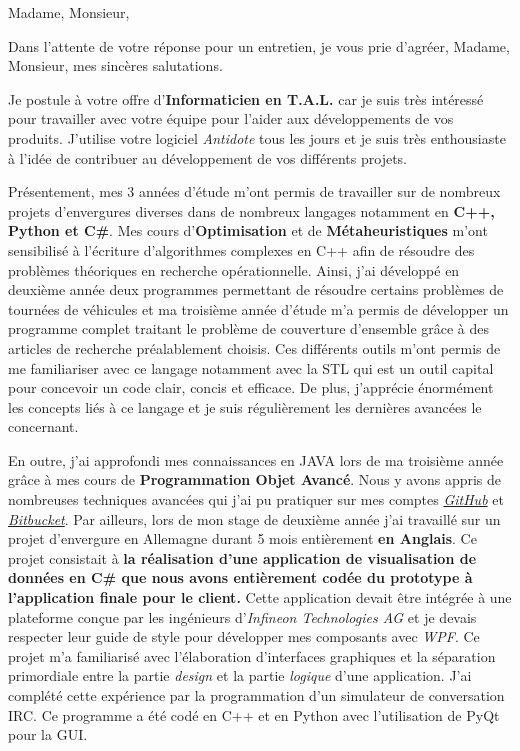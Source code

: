 \date{\today}
\opening{Madame, Monsieur,}
\closing{Dans l'attente de votre réponse pour un entretien, je vous prie d'agréer, Madame, Monsieur, mes sincères salutations.}

\makelettertitle

\introduction{}
Je postule à votre offre d'\textbf{Informaticien en T.A.L.} car je suis très intéressé pour travailler avec votre équipe pour l'aider aux développements de vos produits. J'utilise votre logiciel \textit{Antidote} tous les jours et je suis très enthousiaste à l'idée de contribuer au développement de vos différents projets.

Présentement, mes 3 années d'étude m'ont permis de travailler sur de nombreux projets d'envergures diverses dans de nombreux langages notamment en \textbf{C++, Python et C\#}. Mes cours d'\textbf{Optimisation} et de \textbf{Métaheuristiques} m'ont sensibilisé à l'écriture d'algorithmes complexes en C++ afin de résoudre des problèmes théoriques en recherche opérationnelle. Ainsi, j'ai développé en deuxième année deux programmes permettant de résoudre certains problèmes de tournées de véhicules et ma troisième année d'étude m'a permis de développer un programme complet traitant le problème de couverture d'ensemble grâce à des articles de recherche préalablement choisis. Ces différents outils m'ont permis de me familiariser avec ce langage notamment avec la STL qui est un outil capital pour concevoir un code clair, concis et efficace. De plus, j'apprécie énormément les concepts liés à ce langage et je suis régulièrement les dernières avancées le concernant.

En outre, j'ai approfondi mes connaissances en JAVA lors de ma troisième année grâce à mes cours de \textbf{Programmation Objet Avancé}. Nous y avons appris de nombreuses techniques avancées qui j'ai pu pratiquer sur mes comptes \href{https://github.com/vlnk/ShootYourFridge}{\textit{GitHub}} et \href{https://bitbucket.org/vlnk/tronpoa}{\textit{Bitbucket}}. Par ailleurs, lors de mon stage de deuxième année j'ai travaillé sur un projet d'envergure en Allemagne durant 5 mois entièrement \textbf{en Anglais}. Ce projet consistait à \textbf{la réalisation d'une application de visualisation de données en C\# que nous avons entièrement codée du prototype à l'application finale pour le client.} Cette application devait être intégrée à une plateforme conçue par les ingénieurs d'\textit{Infineon Technologies AG} et je devais respecter leur guide de style pour développer mes composants avec \textit{WPF}. Ce projet m'a familiarisé avec l'élaboration d'interfaces graphiques et la séparation primordiale entre la partie \textit{design} et la partie \textit{logique} d'une application. J'ai complété cette expérience par la programmation d'un simulateur de conversation IRC. Ce programme a été codé en C++ et en Python avec l'utilisation de PyQt pour la GUI. \conclusion{}

\makeletterclosing
